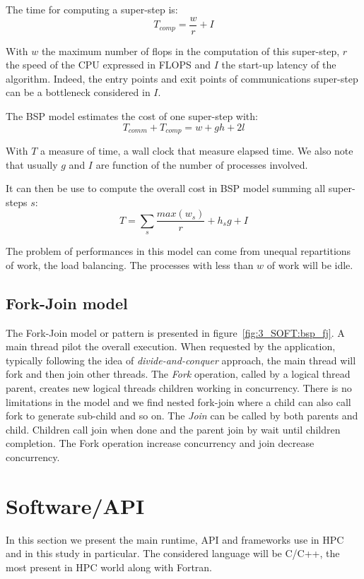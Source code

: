 The time for computing a super-step is: 
\begin{equation}
  T_{comp} = \frac{w}{r} + I
\end{equation}

With $w$ the maximum number of flops in the computation of this super-step, $r$ the speed of the CPU expressed in FLOPS and $I$ the start-up latency of the algorithm.
Indeed, the entry points and exit points of communications super-step can be a bottleneck considered in $I$.


The BSP model estimates the cost of one super-step with: 
\begin{equation}
  T_{comm} + T_{comp} = w + gh + 2l
\end{equation}

With $T$ a measure of time, a wall clock that measure elapsed time. 
We also note that usually $g$ and $I$ are function of the number of processes involved. 

It can then be use to compute the overall cost in BSP model summing all super-steps $s$: 
\begin{equation}
T = \sum_s \frac{max (w_s)}{r} + h_sg + I
\end{equation}

The problem of performances in this model can come from unequal repartitions of work, the load balancing. 
The processes with less than $w$ of work will be idle. 

\subsection{Fork-Join model}
The Fork-Join model or pattern is presented in figure~\ref{fig:3_SOFT:bsp_fj}.
A main thread pilot the overall execution. 
When requested by the application, typically following the idea of \textit{divide-and-conquer} approach, the main thread will fork and then join other threads. 
The \textit{Fork} operation, called by a logical thread parent, creates new logical threads children working in concurrency.
There is no limitations in the model and we find nested fork-join where a child can also call fork to generate sub-child and so on. 
The \textit{Join} can be called by both parents and child. Children call join when done and the parent join by wait until children completion.
The Fork operation increase concurrency and join decrease concurrency.

\section{Software/API}
In this section we present the main runtime, API and frameworks use in HPC and in this study in particular. 
The considered language will be C/C++, the most present in HPC world along with Fortran. 

